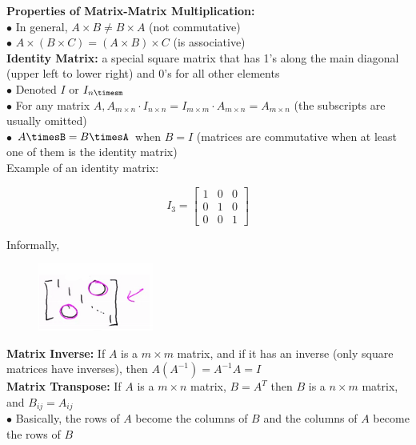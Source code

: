 \pagebreak
\noindent \textbf{Properties of Matrix-Matrix Multiplication:} \\
$\bullet$ In general, $A\times B\not = B\times A$ (not commutative) \\
$\bullet$ $A\times(B\times C)=(A\times B)\times C$ (is associative) \\

\noindent \textbf{Identity Matrix:} a special square matrix that has 1's along the main diagonal
(upper left to lower right) and 0's for all other elements \\
$\bullet$ Denoted $I$ or $I_{n\timesm}$ \\
$\bullet$ For any matrix $A,A_{m\times n}\cdot I_{n\times n}=I_{m\times m}\cdot A_{m\times n}=
A_{m\times n}$ (the subscripts are usually omitted) \\
$\bullet$ $A\timesB=B\timesA$ when $B=I$ (matrices are commutative when at least one of them is the
identity matrix) \\

\noindent Example of an identity matrix:

\begin{equation*}
    I_3 =
    \begin{bmatrix}
        1 & 0 & 0 \\
        0 & 1 & 0 \\
        0 & 0 & 1
    \end{bmatrix}
\end{equation*}

\noindent Informally,

\begin{figure}[hbt!]
    \centering
    \includegraphics[scale=1.2]{Resources/Identity2}
\end{figure}

\noindent \textbf{Matrix Inverse:} If $A$ is a $m\times m$ matrix, and if it has an inverse
(only square matrices have inverses), then $A(A^{-1})=A^{-1}A=I$ \\

\noindent \textbf{Matrix Transpose:} If $A$ is a $m\times n$ matrix, $B=A^T$ then $B$ is a $n\times m$
matrix, and $B_{ij}=A_{ij}$ \\
$\bullet$ Basically, the rows of $A$ become the columns of $B$ and the columns of $A$ become the
rows of $B$

